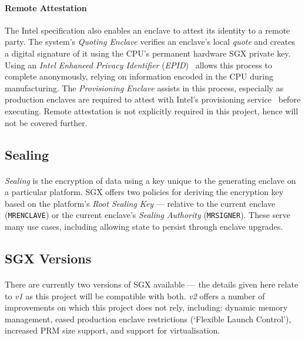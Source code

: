\paragraph{Remote Attestation} The Intel specification also enables an enclave to attest its identity to a remote party. The system's \textit{Quoting Enclave} verifies an enclave's local \textit{quote} and creates a digital signature of it using the CPU's permanent hardware SGX private key. Using an \textit{Intel Enhanced Privacy Identifier} (\textit{EPID})~\cite{epid} allows this process to complete anonymously, relying on information encoded in the CPU during manufacturing. The \textit{Provisioning Enclave} assists in this process, especially as production enclaves are required to attest with Intel's provisioning service~\cite{sgx-prov-service} before executing. Remote attestation is not explicitly required in this project, hence will not be covered further.

\subsection{Sealing}
\label{sec:sealing}
\paragraph{} \textit{Sealing} is the encryption of data using a key unique to the generating enclave on a particular platform. SGX offers two policies for deriving the encryption key based on the platform's \textit{Root Sealing Key} --- relative to the current enclave (\texttt{MRENCLAVE}) or the current enclave's \textit{Sealing Authority} (\texttt{MRSIGNER}). These serve many use cases, including allowing state to persist through enclave upgrades.

\subsection{SGX Versions}
\label{sec:sgx-versions}
\paragraph{} There are currently two versions of SGX available --- the details given here relate to \textit{v1} as this project will be compatible with both. \textit{v2} offers a number of improvements on which this project does not rely, including: dynamic memory management, eased production enclave restrictions (`Flexible Launch Control'), increased PRM size support, and support for virtualisation.


